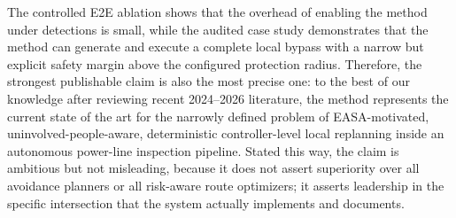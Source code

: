 \documentclass[a4paper,11pt]{article}
\begin{document}
The controlled E2E ablation shows that the overhead of enabling the method under detections is small, while the audited case study demonstrates that the method can generate and execute a complete local bypass with a narrow but explicit safety margin above the configured protection radius. Therefore, the strongest publishable claim is also the most precise one: to the best of our knowledge after reviewing recent 2024--2026 literature, the method represents the current state of the art for the narrowly defined problem of EASA-motivated, uninvolved-people-aware, deterministic controller-level local replanning inside an autonomous power-line inspection pipeline. Stated this way, the claim is ambitious but not misleading, because it does not assert superiority over all avoidance planners or all risk-aware route optimizers; it asserts leadership in the specific intersection that the system actually implements and documents.

\printbibliography
\end{document}
